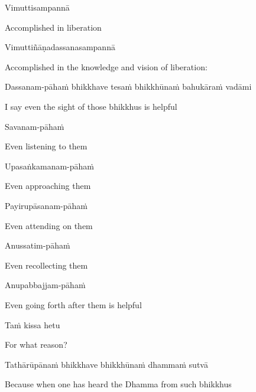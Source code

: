 Vimuttisampannā

\begin{english}
  Accomplished in liberation
\end{english}

Vimuttiñāṇadassanasampannā

\begin{english}
  Accomplished in the knowledge and vision of liberation:
\end{english}

\begin{pali-hang}
  Dassanam-pāhaṁ bhikkhave tesaṁ bhikkhūnaṁ bahukāraṁ vadāmi
\end{pali-hang}

\begin{english}
  I say even the sight of those bhikkhus is helpful
\end{english}

Savanam-pāhaṁ

\begin{english}
  Even listening to them
\end{english}

Upasaṅkamanam-pāhaṁ

\begin{english}
  Even approaching them
\end{english}

Payirupāsanam-pāhaṁ

\begin{english}
  Even attending on them
\end{english}

Anussatim-pāhaṁ

\begin{english}
  Even recollecting them
\end{english}

Anupabbajjam-pāhaṁ

\begin{english}
  Even going forth after them is helpful
\end{english}

Taṁ kissa hetu

\begin{english}
  For what reason?
\end{english}

Tathārūpānaṁ bhikkhave bhikkhūnaṁ dhammaṁ sutvā

\begin{english}
  Because when one has heard the Dhamma from such bhikkhus
\end{english}


